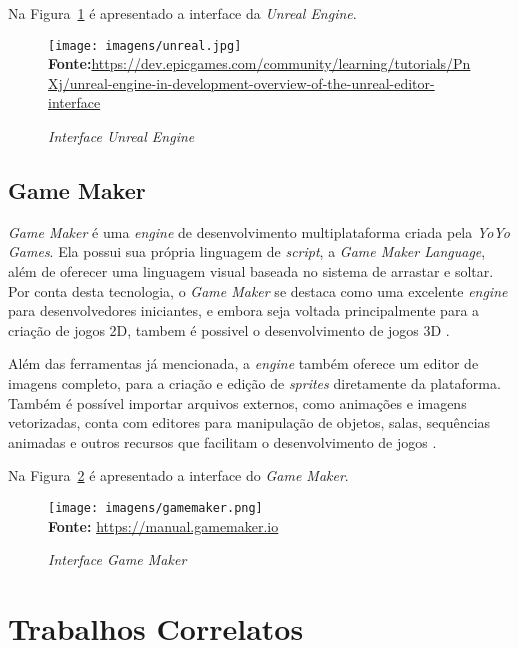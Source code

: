 Na Figura~\ref{fig:unreal} é apresentado a interface da \textit{Unreal Engine}.

\FloatBarrier 
\begin{figure}[!htbp]
	\centering
	\caption{\textit{Interface Unreal Engine}}
	\texttt{[image: imagens/unreal.jpg]}
	\\\textbf{Fonte:}\url{https://dev.epicgames.com/community/learning/tutorials/PnXj/unreal-engine-in-development-overview-of-the-unreal-editor-interface} 
	\label{fig:unreal}
\end{figure}
\FloatBarrier


\subsection{Game Maker}	

\textit{Game Maker} é uma \textit{engine} de desenvolvimento multiplataforma
criada pela \textit{YoYo Games}. Ela possui sua própria linguagem de \textit{script}, a \textit{Game Maker Language}, além de oferecer uma linguagem visual baseada no sistema de arrastar e soltar. Por conta desta tecnologia, o \textit{Game Maker} se destaca como uma excelente \textit{engine} para desenvolvedores iniciantes, e embora seja voltada principalmente para a criação de jogos 2D, tambem é possivel o desenvolvimento de jogos 3D \cite{Sparks2020}.

Além das ferramentas já mencionada, a \textit{engine} também oferece um editor de imagens completo, para a criação e edição de \textit{sprites} diretamente da plataforma. Também é possível importar arquivos externos, como animações e imagens vetorizadas, conta com editores para manipulação de objetos, salas, sequências animadas e outros recursos que facilitam o desenvolvimento de jogos \cite{GameMakerManual2023}. 

Na Figura~\ref{fig:gamemaker} é apresentado a interface do \textit{Game Maker}.

\FloatBarrier 
\begin{figure}[!htbp]
	\centering
	\caption{\textit{Interface Game Maker}}
	\texttt{[image: imagens/gamemaker.png]}
	\\\textbf{Fonte:} \url{	https://manual.gamemaker.io}
	\label{fig:gamemaker}
\end{figure}
\FloatBarrier


\section{Trabalhos Correlatos}


